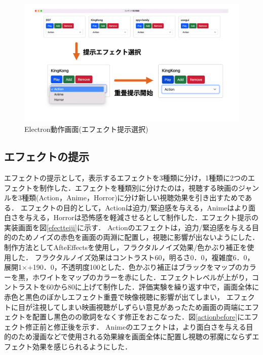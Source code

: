 \begin{figure}[H]
   \centering
   \includegraphics[width=17cm]{images/chapter3/efect_setumei.png}
   \caption{Electron動作画面(エフェクト提示選択)}
   \label{efectsentaku}
\end{figure}
 
\subsection{エフェクトの提示}
エフェクトの提示として，表示するエフェクトを3種類に分け，1種類に2つのエフェクトを制作した．エフェクトを種類別に分けたのは，視聴する映画のジャンルを3種類(Action，Anime，Horror)に分け新しい視聴効果を引き出すためである．
エフェクトの目的として，Actionは迫力/緊迫感を与える，Animeはより面白さを与える，Horrorは恐怖感を軽減させるとして制作した．エフェクト提示の実装画面を図\ref{efectteiji}に示す．
Actionのエフェクトは，迫力/緊迫感を与える目的のためノイズの赤色を画面の両淵に配置し，視聴に影響が出ないようにした．制作方法としてAfteEffectsを使用し，フラクタルノイズ効果/色かぶり補正を使用した．
フラクタルノイズ効果はコントラスト60，明るさ0．0，複雑度6．0，展開1×+190．0，不透明度100とした．色かぶり補正はブラックをマップのカラーを黒，ホワイトをマップのカラーを赤にした．エフェクトレベルが上がり，コントラストを60から80に上げて制作した．評価実験を繰り返す中で，画面全体に赤色と黒色のぼかしエフェクト重畳で映像視聴に影響が出てしまい，
エフェクトに目が注視してしまい映画視聴がしずらい意見があったため画面の両端にエフェクトを配置し黒色のの歌詞をなくす修正をおこなった．図\ref{actionbefore}にエフェクト修正前と修正後を示す．
Animeのエフェクトは，より面白さを与える目的のため漫画などで使用される効果線を画面全体に配置し視聴の邪魔にならずエフェクト効果を感じられるようにした．
 
